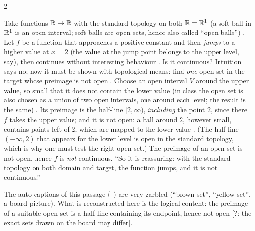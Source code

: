 \begin{paracol}{2}
\begin{example}\label{ex:tm-step}
Take functions $\mathbb{R}\to\mathbb{R}$ with the standard topology on both $\mathbb{R}=\mathbb{R}^1$ (a soft ball in $\mathbb{R}^1$ is an open interval; soft
balls are open sets, hence also called ``open balls'') .
Let $f$ be a function that approaches a positive constant and then \emph{jumps} to a higher value at $x=2$ (the value at
the jump point belongs to the upper level, say), then continues without interesting behaviour .
Is it continuous? Intuition says no; now it must be shown with topological means: find \emph{one} open set in the target
whose preimage is not open .
Choose an open interval $V$ around the upper value, so small that it does not contain the lower value (in class the open set
is also chosen as a union of two open intervals, one around each level; the result is the same)
. Its preimage is the half-line $[2,\infty)$, \emph{including} the point $2$,
since there $f$ takes the upper value; and it is not open: a ball around $2$, however small, contains points left of $2$,
which are mapped to the lower value .
(The half-line $(-\infty,2)$ that appears for the lower level is open in the standard topology, 
which is why one must test the right open set.)
The preimage of an open set is not open, hence $f$ is \emph{not} continuous. ``So it is reassuring: with the standard
topology on both domain and target, the function jumps, and it is not continuous.''
\end{example}
\begin{coursenote}
The auto-captions of this passage (--) are very garbled (``brown set'', ``yellow set'',
a board picture). What is reconstructed here is the logical content: the preimage of a suitable open set is a half-line
containing its endpoint, hence not open [?: the exact sets drawn on the board may differ].
\end{coursenote}


\end{paracol}
